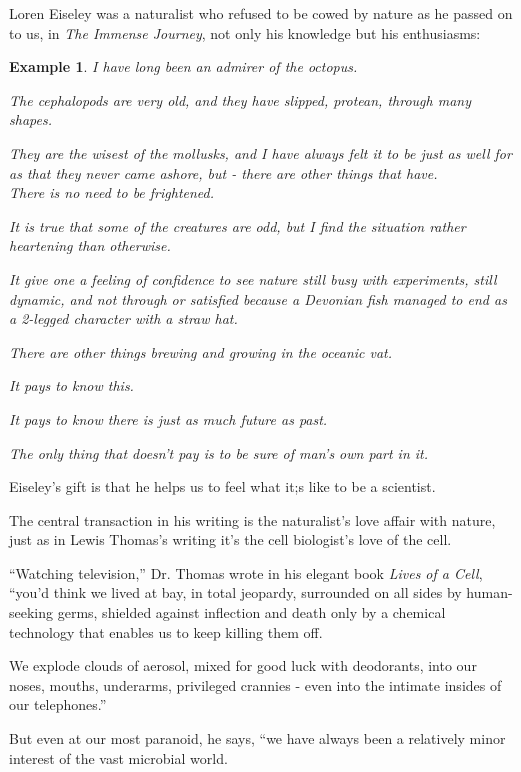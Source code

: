 \documentclass{book}
\numberwithin{equation}{section}
\newtheorem{example}{Example}[chapter]
\begin{document}
Loren Eiseley was a naturalist who refused to be cowed by nature as he passed on to us, in \textit{The Immense Journey}, not only his knowledge but his enthusiasms:
\begin{example}
    I have long been an admirer of the octopus.
    
    The cephalopods are very old, and they have slipped, protean, through many shapes.
    
    They are the wisest of the mollusks, and I have always felt it to be just as well for as that they never came ashore, but - there are other things that have.
    \\
    
    There is no need to be frightened.
    
    It is true that some of the creatures are odd, but I find the situation rather heartening than otherwise.
    
    It give one a feeling of confidence to see nature still busy with experiments, still dynamic, and not through or satisfied because a Devonian fish managed to end as a 2-legged character with a straw hat.
    
    There are other things brewing and growing in the oceanic vat.
    
    It pays to know this.
    
    It pays to know there is just as much future as past.
    
    The only thing that doesn't pay is to be sure of man's own part in it.
\end{example}
Eiseley's gift is that he helps us to feel what it;s like to be a scientist.

The central transaction in his writing is the naturalist's love affair with nature, just as in Lewis Thomas's writing it's the cell biologist's love of the cell.

``Watching television,'' Dr. Thomas wrote in his elegant book \textit{Lives of a Cell}, ``you'd think we lived at bay, in total jeopardy, surrounded on all sides by human-seeking germs, shielded against inflection and death only by a chemical technology that enables us to keep killing them off.

We explode clouds of aerosol, mixed for good luck with deodorants, into our noses, mouths, underarms, privileged crannies - even into the intimate insides of our telephones.''

But even at our most paranoid, he says, ``we have always been a relatively minor interest of the vast microbial world.
\end{document}
